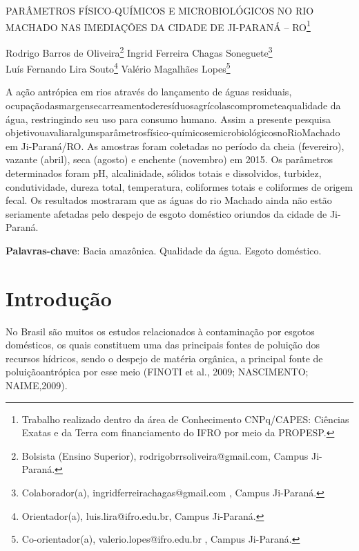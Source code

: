 \documentclass[article,12pt,onesidea,4paper,english,brazil]{abntex2}
\begin{document}
	
	
	\frenchspacing 
	
	\begin{center}
		\LARGE PARÂMETROS FÍSICO-QUÍMICOS E MICROBIOLÓGICOS NO RIO MACHADO NAS IMEDIAÇÕES DA CIDADE DE JI-PARANÁ – RO\footnote{Trabalho realizado dentro da área de Conhecimento CNPq/CAPES: Ciências Exatas e da Terra com financiamento do IFRO por meio da PROPESP.}
		
		\normalsize
		Rodrigo Barros de Oliveira\footnote{Bolsista (Ensino Superior), rodrigobrrsoliveira@gmail.com, Campus Ji-Paraná.} 
		Ingrid Ferreira Chagas Soneguete\footnote{Colaborador(a), ingridferreirachagas@gmail.com , Campus Ji-Paraná.}\\ 
		Luís Fernando Lira Souto\footnote{Orientador(a), luis.lira@ifro.edu.br, Campus Ji-Paraná.} 
		Valério Magalhães Lopes\footnote{Co-orientador(a), valerio.lopes@ifro.edu.br , Campus Ji-Paraná.} 
	\end{center}
	
	\begin{resumoumacoluna}
		A ação antrópica em rios através do lançamento de águas residuais, ocupaçãodasmargensecarreamentoderesíduosagrícolascomprometeaqualidade da água, restringindo seu uso para consumo humano. Assim a presente pesquisa objetivouavaliaralgunsparâmetrosfísico-químicosemicrobiológicosnoRioMachado em Ji-Paraná/RO. As amostras foram coletadas no período da cheia (fevereiro), vazante (abril), seca (agosto) e enchente (novembro) em 2015. Os parâmetros determinados foram pH, alcalinidade, sólidos totais e dissolvidos, turbidez, condutividade, dureza total, temperatura, coliformes totais e coliformes de origem fecal. Os resultados mostraram que as águas do rio Machado ainda não estão seriamente afetadas pelo despejo de esgoto doméstico oriundos da cidade de Ji- Paraná.
		
		\vspace{\onelineskip}
		
		\noindent
		\textbf{Palavras-chave}: Bacia amazônica. Qualidade da água. Esgoto doméstico.
		
	\end{resumoumacoluna}
	
	\section*{Introdução}
	
No Brasil são muitos os estudos relacionados à contaminação por esgotos domésticos, os quais constituem uma das principais fontes de poluição dos recursos hídricos, sendo o despejo de matéria orgânica, a principal fonte de poluiçãoantrópica por esse meio (FINOTI et al., 2009; NASCIMENTO; NAIME,2009).
\end{document}
